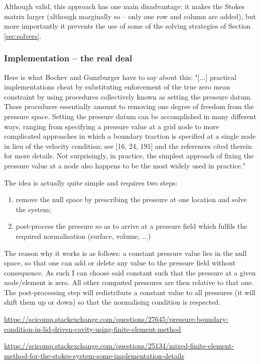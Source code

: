 Although valid, this approach has one main disadvantage: it makes the Stokes matrix larger (although
marginally so -- only one row and column are added), but more importantly it prevents the use of some
of the solving strategies of Section \ref{sec:solvers}.


\subsubsection{Implementation -- the real deal}

Here is what Bochev and Gunzburger \cite[Section 7.6.4]{bogu09} have to say about this:
"[...] practical implementations cheat by substituting enforcement of the true zero mean constraint by using
procedures collectively known as setting the pressure datum. These procedures essentially 
amount to removing one degree of freedom from the pressure space.
Setting the pressure datum can be accomplished in many different ways, ranging
from specifying a pressure value at a grid node to more complicated approaches in
which a boundary traction is specified at a single node in lieu of the velocity condition; 
see [16, 24, 191] and the references cited therein for more details. Not surprisingly, 
in practice, the simplest approach of fixing the pressure value at a node also
happens to be the most widely used in practice."




The idea is actually quite simple and requires two steps:
\begin{enumerate}
\item remove the null space by prescribing the pressure at one location and solve the system;
\item post-process the pressure so as to arrive at a pressure field which fulfils the required normalisation (surface, volume, ...)
\end{enumerate}

The reason why it works is as follows: a constant pressure value lies in the null space, so that one can 
add or delete any value to the pressure field without consequence. As such I can choose said constant such that 
the pressure at a given node/element is zero. All other computed pressures are then relative to that one. 
The post-processing step will redistribute a constant value to all pressures (it will shift them up or down)
so that the normalising condition is respected. 


\Literature

\url{https://scicomp.stackexchange.com/questions/27645/pressure-boundary-condition-in-lid-driven-cavity-using-finite-element-method}

\url{
https://scicomp.stackexchange.com/questions/25134/mixed-finite-element-method-for-the-stokes-system-some-implementation-details}





